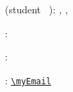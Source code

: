 \thispagestyle{empty}

\hfill

\vfill

\noindent\myName (student \textnumero~\myNumber): \textit{\myTitle,} \mySubtitle, \textcopyright\ \myTime

\bigskip

\noindent{}: \mySupervisor

\medskip

\noindent{}: \myLocation

\medskip

\noindent{}: \href{mailto:\myEmail}{\nolinkurl{\myEmail}}

\medskip
